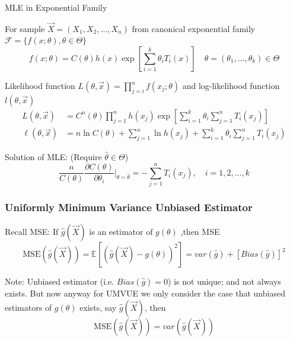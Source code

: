 \begin{point}
    MLE in Exponential Family
\end{point}


        For sample $\vec{X}=(X_1,X_2,\ldots,X_n)$ from canonical exponential family $\mathscr{F}=\{f(x;\theta),\theta\in\Theta\}$
        \begin{equation}
            f(x;\theta)=C(\theta)h(x)\exp\left[\sum_{i=1}^k\theta_iT_i(x)\right]\quad \theta=(\theta_1,\ldots,\theta_k)\in\Theta
        \end{equation}

        Likelihood function $L(\theta,\vec{x})=\prod_{j=i}^nf(x_j;\theta)$ and log-likelihood function $l(\theta,\vec{x})$
        \begin{align}
            L(\theta,\vec{x})&=C^n(\theta)\prod_{j=1}^nh(x_j)\exp\left[\sum_{i=1}^k\theta_i\sum_{j=1}^n T_i(x_j)\right]\\
            \ell(\theta,\vec{x})&=n\ln C(\theta)+\sum_{j=1}^n\ln h(x_j)+\sum_{i=1}^k\theta_i\sum_{j=1}^nT_i(x_j)
        \end{align}

        Solution of MLE: (Require $\hat{\theta}\in\Theta$)
        \begin{equation}
            \frac{n}{C(\theta)}\frac{\partial C(\theta)}{\partial \theta_i}\bigg|_{\theta=\hat{\theta}}=-\sum_{j=1}^nT_i(x_j),\quad i=1,2,\ldots,k    
        \end{equation}


\subsubsection{Uniformly Minimum Variance Unbiased Estimator}\label{SubSectionUMVUE}
        Recall MSE: If $\hat{g}(\vec{X})$ is an estimator of $g(\theta)$ ,then MSE
        \begin{equation}
            \mathrm{MSE}(\hat{g}(\vec{X}))=\mathbb{E}[(\hat{g}(\vec{X})-g(\theta))^2]=var(\hat{g})+[Bias(\hat{g})]^2
        \end{equation}

        Note:
    Unbiased estimator (i.e. $Bias(\hat{g})=0$) is not unique; and not always exists. But now anyway for UMVUE we only consider the case that unbiased estimators of $g(\theta)$ exists, say $\hat{g}(\vec{X})$, then
        \begin{equation} \mathrm{MSE}(\hat{g}(\vec{X}))=var(\hat{g}(\vec{X})) \end{equation}


